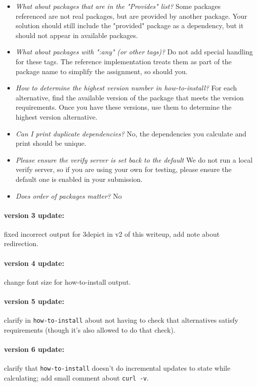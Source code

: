 \documentclass[12pt]{article}
\renewcommand{\_}{\kern-1.5pt\textunderscore\kern-1.5pt}
\begin{document}
\begin{itemize}
\item \emph{What about packages that are in the "Provides" list?} Some packages referenced are not real packages, but are provided by another package. Your solution should still include the "provided" package as a dependency, but it should not appear in available packages.
\item \emph{What about packages with ":any" (or other tags)?} Do not add special handling for these tags. The reference implementation treats them as part of the package name to simplify the assignment, so should you.
\item \emph{How to determine the highest version number in how-to-install?} For each alternative, find the available version of the package that meets the version requirements. Once you have these versions, use them to determine the highest version alternative.
\item \emph{Can I print duplicate dependencies?} No, the dependencies you calculate and print should be unique.
\item \emph{Please ensure the verify server is set back to the default} We do not run a local verify server, so if you are using your own for testing, please ensure the default one is enabled in your submission.
\item \emph{Does order of packages matter?} No
\end{itemize}

\paragraph{version 3 update:} fixed incorrect output for 3depict in v2 of this writeup, add note about redirection.

\paragraph{version 4 update:} change font size for how-to-install output.

\paragraph{version 5 update:} clarify in \texttt{how-to-install} about not having to check that alternatives satisfy requirements (though it's also allowed to do that check).

\paragraph{version 6 update:} clarify that \texttt{how-to-install} doesn't do incremental updates to state while calculating; add small comment about \verb+curl -v+.
\end{document}

